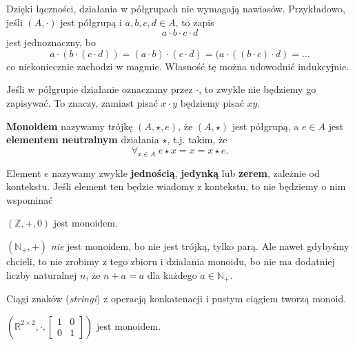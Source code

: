 Dzięki łączności,
	działania w półgrupach nie wymagają nawiasów.
Przykładowo, jeśli $(A, \cdot)$ jest półgrupą i $a, b, c, d \in A$,
	to zapis
\begin{equation}
	a \cdot b \cdot c \cdot d
\end{equation}
	jest jednoznaczny, bo
\begin{equation}
		a \cdot (b \cdot (c \cdot d)) = 
		(a \cdot b) \cdot (c \cdot d) =
		(a \cdot ((b \cdot c) \cdot d) = \dots
\end{equation}
	co niekoniecznie zachodzi w magmie.
Własność tę można udowodnić indukcyjnie.

Jeśli w półgrupie działanie oznaczamy przez $\cdot$,
	to zwykle nie będziemy go zapisywać.
To znaczy, zamiast pisać $x \cdot y$ będziemy pisać $xy$.

\begin{definition}
	\textbf{Monoidem} nazywamy trójkę $(A, \star, e)$,
		że $(A, \star)$ jest półgrupą,
		a $e\in A$ jest \textbf{elementem neutralnym} działania $\star$,
		t.j. takim, że
	\begin{equation}
		\forall_{x \in A}\; e \star x = x = x \star e.
	\end{equation}
\end{definition}

Element $e$ nazywamy zwykle \textbf{jednością},
	\textbf{jedynką} lub \textbf{zerem},
	zależnie od kontekstu.
Jeśli element ten będzie wiadomy z kontekstu,
	to nie będziemy o nim wspominać

\begin{example}
	$(\mathbb{Z}, +, 0)$ jest monoidem.
\end{example}

\begin{example}
	$(\mathbb{N}_+, +)$ \textit{nie} jest monoidem, bo nie jest trójką, tylko parą.
	Ale nawet gdybyśmy chcieli,
		to nie zrobimy z tego zbioru i działania monoidu,
		bo nie ma dodatniej liczby naturalnej $n$,
		że $n + a = a$ dla każdego $a \in \mathbb{N}_+$.
\end{example}

\begin{example}
	Ciągi znaków (\textit{stringi}) z operacją konkatenacji i pustym ciągiem tworzą monoid.
\end{example}

\begin{example}
	$\left(\mathbb{R}^{2 \times 2}, \cdot, \left[\begin{matrix} 1 & 0 \\ 0 & 1 \end{matrix}\right]\right)$ jest monoidem.
\end{example}

